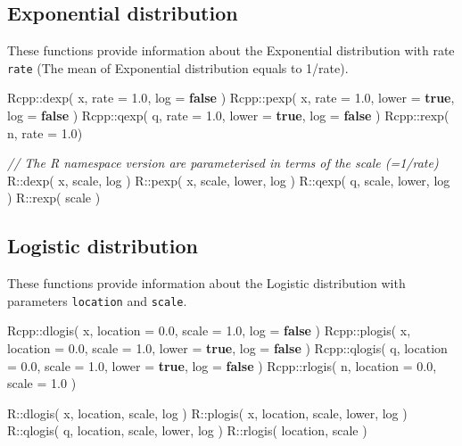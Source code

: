 \documentclass[
]{book}
\newenvironment{Shaded}{\begin{snugshade}}{\end{snugshade}}
\newcommand{\CommentTok}[1]{\textcolor[rgb]{0.56,0.35,0.01}{\textit{#1}}}
\newcommand{\FloatTok}[1]{\textcolor[rgb]{0.00,0.00,0.81}{#1}}
\newcommand{\KeywordTok}[1]{\textcolor[rgb]{0.13,0.29,0.53}{\textbf{#1}}}
\newcommand{\NormalTok}[1]{#1}
\begin{document}
\hypertarget{exponential-distribution}{%
\subsection{Exponential distribution}\label{exponential-distribution}}

These functions provide information about the Exponential distribution with rate \texttt{rate} (The mean of Exponential distribution equals to 1/rate).

\begin{Shaded}
\begin{Highlighting}[]
\NormalTok{Rcpp::dexp( x, rate = }\FloatTok{1.0}\NormalTok{,               log = }\KeywordTok{false}\NormalTok{ )}
\NormalTok{Rcpp::pexp( x, rate = }\FloatTok{1.0}\NormalTok{, lower = }\KeywordTok{true}\NormalTok{, log = }\KeywordTok{false}\NormalTok{ )}
\NormalTok{Rcpp::qexp( q, rate = }\FloatTok{1.0}\NormalTok{, lower = }\KeywordTok{true}\NormalTok{, log = }\KeywordTok{false}\NormalTok{ )}
\NormalTok{Rcpp::rexp( n, rate = }\FloatTok{1.0}\NormalTok{)}

\CommentTok{// The R namespace version are parameterised in terms of the scale (=1/rate)}
\NormalTok{R::dexp( x, scale,        log )}
\NormalTok{R::pexp( x, scale, lower, log )}
\NormalTok{R::qexp( q, scale, lower, log )}
\NormalTok{R::rexp(    scale )}
\end{Highlighting}
\end{Shaded}

\hypertarget{logistic-distribution}{%
\subsection{Logistic distribution}\label{logistic-distribution}}

These functions provide information about the Logistic distribution with parameters \texttt{location} and \texttt{scale}.

\begin{Shaded}
\begin{Highlighting}[]
\NormalTok{Rcpp::dlogis( x, location = }\FloatTok{0.0}\NormalTok{, scale = }\FloatTok{1.0}\NormalTok{,               log = }\KeywordTok{false}\NormalTok{ )}
\NormalTok{Rcpp::plogis( x, location = }\FloatTok{0.0}\NormalTok{, scale = }\FloatTok{1.0}\NormalTok{, lower = }\KeywordTok{true}\NormalTok{, log = }\KeywordTok{false}\NormalTok{ )}
\NormalTok{Rcpp::qlogis( q, location = }\FloatTok{0.0}\NormalTok{, scale = }\FloatTok{1.0}\NormalTok{, lower = }\KeywordTok{true}\NormalTok{, log = }\KeywordTok{false}\NormalTok{ )}
\NormalTok{Rcpp::rlogis( n, location = }\FloatTok{0.0}\NormalTok{, scale = }\FloatTok{1.0}\NormalTok{ )}

\NormalTok{R::dlogis( x, location, scale,        log )}
\NormalTok{R::plogis( x, location, scale, lower, log )}
\NormalTok{R::qlogis( q, location, scale, lower, log )}
\NormalTok{R::rlogis(    location, scale )}
\end{Highlighting}
\end{Shaded}
\end{document}
